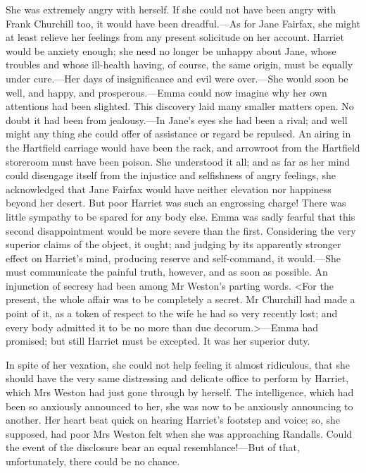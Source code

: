She was extremely angry with herself. If she could not have been angry with Frank Churchill too, it would have been dreadful.—As for Jane Fairfax, she might at least relieve her feelings from any present solicitude on her account. Harriet would be anxiety enough; she need no longer be unhappy about Jane, whose troubles and whose ill-health having, of course, the same origin, must be equally under cure.—Her days of insignificance and evil were over.—She would soon be well, and happy, and prosperous.—Emma could now imagine why her own attentions had been slighted. This discovery laid many smaller matters open. No doubt it had been from jealousy.—In Jane's eyes she had been a rival; and well might any thing she could offer of assistance or regard be repulsed. An airing in the Hartfield carriage would have been the rack, and arrowroot from the Hartfield storeroom must have been poison. She understood it all; and as far as her mind could disengage itself from the injustice and selfishness of angry feelings, she acknowledged that Jane Fairfax would have neither elevation nor happiness beyond her desert. But poor Harriet was such an engrossing charge! There was little sympathy to be spared for any body else. Emma was sadly fearful that this second disappointment would be more severe than the first. Considering the very superior claims of the object, it ought; and judging by its apparently stronger effect on Harriet's mind, producing reserve and self-command, it would.—She must communicate the painful truth, however, and as soon as possible. An injunction of secresy had been among Mr Weston's parting words. <For the present, the whole affair was to be completely a secret. Mr Churchill had made a point of it, as a token of respect to the wife he had so very recently lost; and every body admitted it to be no more than due decorum.>—Emma had promised; but still Harriet must be excepted. It was her superior duty.

In spite of her vexation, she could not help feeling it almost ridiculous, that she should have the very same distressing and delicate office to perform by Harriet, which Mrs Weston had just gone through by herself. The intelligence, which had been so anxiously announced to her, she was now to be anxiously announcing to another. Her heart beat quick on hearing Harriet's footstep and voice; so, she supposed, had poor Mrs Weston felt when she was approaching Randalls. Could the event of the disclosure bear an equal resemblance!—But of that, unfortunately, there could be no chance.

